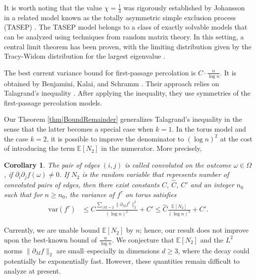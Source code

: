 \documentclass[reqno]{amsart}
\newtheorem{corollary}{Corollary}
\begin{document}
It is worth noting that the value $\chi=\frac13$ was rigorously established by Johansson in a related model known as the totally asymmetric simple exclusion process (TASEP) \cite{Johansson2000}. 
The TASEP model belongs to a class of exactly solvable models that can be analyzed using techniques from random matrix theory. In this setting, a central limit theorem has been proven, with the limiting 
distribution given by the Tracy-Widom distribution for the
largest eigenvalue \cite{TracyWidom1994}.

The best current variance bound for first-passage percolation is $C\cdot\frac{n}{\log n}$. It is obtained by Benjamini, Kalai, and Schramm \cite{benjamini2006}. 
Their approach relies on Talagrand's inequality \cite{talagrand1994}. After applying the inequality, they use symmetries of the first-passage percolation models. 

Our Theorem \ref{thm|BoundRemainder} generalizes Talagrand's inequality in the sense that the latter becomes a special case when $k=1$. In the torus model and the case $k=2$, it is possible to improve the denominator 
to $(\log n)^2$ at the cost of introducing the term $\mathbb E\left[N_2\right]$ in the numerator. More precisely,

  
\begin{corollary}\label{thm|Consequence2} The pair of edges $(i,j)$ is called {\em convoluted} on the outcome $\omega\in \Omega$, if $\partial_i\partial_jf(\omega)\neq 0$.   
If $N_2$ is the random variable that represents number of convoluted pairs of edges, then there exist constants $C$, $\hat C$, $C'$ and an integer $n_0$ such that for $n\geq n_0$, the variance of $f^{\tau}$ on torus satisfies 
\begin{align}
\text{var}(f^{\tau}) &\leq C\frac{\sum_{|M|=2}\|\partial_Mf^{\tau}\|_2^2}{(\log n)^2}+C'\leq \hat C\frac{\mathbb E[N_2]}{(\log n)^2}+C'.  \label{eqn|convN} 
\end{align}
\end{corollary}



Currently, we are unable bound 
$\mathbb E[N_2]$ by $n$; hence, our result does not improve upon the best-known bound of $\frac{n}{\log n}$.   
We conjecture that $\mathbb E[N_2]$ and the $L^2$ norms $\|\partial_M f\|_2$ are small--especially in dimensions $d\geq 3$, where the decay could potentially be exponentially fast.
However, these quantities remain difficult to analyze at present.
\end{document}
